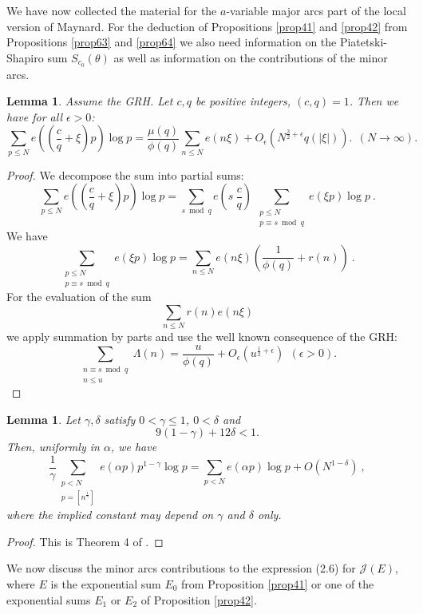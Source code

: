 \documentclass{amsart}
\newtheorem{lemma}[theorem]{Lemma}
\numberwithin{equation}{subsection}
\begin{document}
We have now collected the material for the $a$-variable major arcs part of the local version of Maynard. For the deduction of Propositions \ref{prop41} and \ref{prop42} from Propositions \ref{prop63} and \ref{prop64} we also need information  on the Piatetski-Shapiro sum $S_{c_0}(\theta)$ as well as  information on the contributions of the  minor arcs.


\begin{lemma}\label{lem61}
Assume  the GRH. Let $c, q$ be positive integers, $(c,q)=1$. Then we have for all $\epsilon>0$:
$$\sum_{p\leq N} e\left(\left(\frac{c}{q}+\xi\right)p\right)\log p=\frac{\mu(q)}{\phi(q)} \sum_{n\leq N} e(n\xi)+O_\epsilon(N^{\frac{3}{2}+\epsilon} q(|\xi|)).\ \ (N\rightarrow \infty).$$
\end{lemma}

\begin{proof}
We decompose the sum into partial sums:
$$\sum_{p\leq N} e\left(\left(\frac{c}{q}+\xi\right)p\right)\log p= \sum_{s\bmod q} e\left(s\:\frac{c}{q}\right)\:\sum_{\substack{p\leq N \\ p\equiv s \bmod q}} e(\xi p)\log p\:.$$
We have 
$$  \sum_{\substack{p\leq N \\ p\equiv s \bmod q}} e(\xi p)\log p=\sum_{n\leq N} e(n\xi)\left(\frac{1}{\phi(q)}+r(n)\right)\:.$$
For the evaluation of the sum 
$$\sum_{n\leq N} r(n)e(n\xi)$$
we apply summation by parts and use the well known consequence of the GRH:
$$\sum_{\substack{n\equiv s \bmod q \\ n\leq u  }} \Lambda(n)=\frac{u}{\phi(q)}+O_\epsilon(u^{\frac{1}{2}+\epsilon})\ \ (\epsilon>0).$$
\end{proof}

\begin{lemma}\label{lem62}
Let $\gamma, \delta$ satisfy $0<\gamma\leq 1$, $0<\delta$ and 
$$9(1-\gamma)+12\delta<1.$$
Then, uniformly in $\alpha$, we have
$$\frac{1}{\gamma}\sum_{\substack{p<N \\ p=[n^{\frac{1}{\gamma}}]  }} e(\alpha p) p^{1-\gamma}\log p=\sum_{p<N}e(\alpha p)\log p+O(N^{1-\delta})\:,$$
where the implied constant may depend on $\gamma$ and $\delta$ only.
\end{lemma}

\begin{proof}
This is Theorem 4 of \cite{balog}.
\end{proof}

We now discuss the minor arcs contributions to the expression (2.6) for $\mathcal{J}(E)$, where $E$ is the exponential sum $E_0$ from Proposition \ref{prop41} or one of the exponential sums $E_1$ or $E_2$ of Proposition \ref{prop42}.
\end{document}
